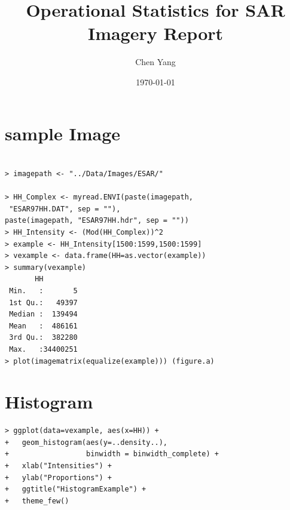 \documentclass{article}
\title{Operational Statistics for SAR Imagery Report}
\author{Chen Yang}
\date\today
\begin{document}
\maketitle
\section{sample Image}
\begin{lstlisting}[frame=tb]

> imagepath <- "../Data/Images/ESAR/"

> HH_Complex <- myread.ENVI(paste(imagepath,
 "ESAR97HH.DAT", sep = ""), 
paste(imagepath, "ESAR97HH.hdr", sep = ""))
> HH_Intensity <- (Mod(HH_Complex))^2
> example <- HH_Intensity[1500:1599,1500:1599]
> vexample <- data.frame(HH=as.vector(example))
> summary(vexample)
       HH          
 Min.   :       5  
 1st Qu.:   49397  
 Median :  139494  
 Mean   :  486161  
 3rd Qu.:  382280  
 Max.   :34400251 
> plot(imagematrix(equalize(example))) (figure.a)
\end{lstlisting}
\begin{figure}[htbp]
	\centering
	\quad
	\quad
\end{figure}

\section{Histogram}
\begin{lstlisting}[frame=tb]
> ggplot(data=vexample, aes(x=HH)) + 
+   geom_histogram(aes(y=..density..), 
+                  binwidth = binwidth_complete) + 
+   xlab("Intensities") +
+   ylab("Proportions") +
+   ggtitle("HistogramExample") +
+   theme_few()
\end{lstlisting}
\end{document}
